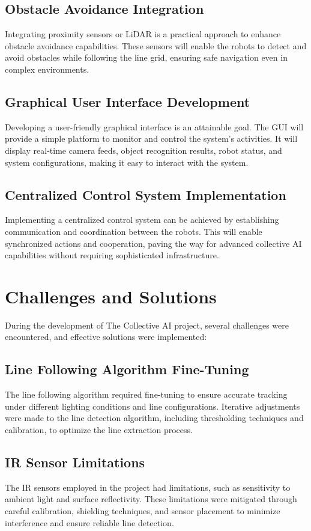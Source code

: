 \documentclass[a4paper,12pt,oneside]{book}
\begin{document}
\subsection{Obstacle Avoidance Integration}
Integrating proximity sensors or LiDAR is a practical approach to enhance obstacle avoidance capabilities. These sensors will enable the robots to detect and avoid obstacles while following the line grid, ensuring safe navigation even in complex environments.

\subsection{Graphical User Interface Development}
Developing a user-friendly graphical interface is an attainable goal. The GUI will provide a simple platform to monitor and control the system's activities. It will display real-time camera feeds, object recognition results, robot status, and system configurations, making it easy to interact with the system.

\subsection{Centralized Control System Implementation}
Implementing a centralized control system can be achieved by establishing communication and coordination between the robots. This will enable synchronized actions and cooperation, paving the way for advanced collective AI capabilities without requiring sophisticated infrastructure.
\newpage
\section{Challenges and Solutions}
During the development of The Collective AI project, several challenges were encountered, and effective solutions were implemented:

\subsection{Line Following Algorithm Fine-Tuning}
The line following algorithm required fine-tuning to ensure accurate tracking under different lighting conditions and line configurations. Iterative adjustments were made to the line detection algorithm, including thresholding techniques and calibration, to optimize the line extraction process.

\subsection{IR Sensor Limitations}
The IR sensors employed in the project had limitations, such as sensitivity to ambient light and surface reflectivity. These limitations were mitigated through careful calibration, shielding techniques, and sensor placement to minimize interference and ensure reliable line detection.
\end{document}
